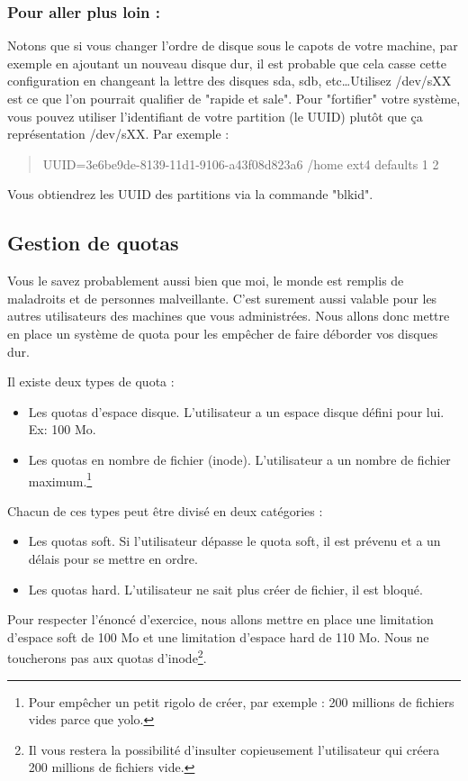 \documentclass[a4paper]{article}
\newcommand{\commande}[1] {
    \begin{quote}
    \tt\raggedright #1 
    \end{quote}
}
\begin{document}
\subsubsection*{Pour aller plus loin :}
\par Notons que si vous changer l'ordre de disque sous le capots de votre machine, par exemple en ajoutant un nouveau disque dur, il est probable que cela casse cette configuration en changeant la lettre des disques sda, sdb, etc\dots Utilisez /dev/sXX est ce que l'on pourrait qualifier de "rapide et sale". Pour "fortifier" votre système, vous pouvez utiliser l'identifiant de votre partition (le UUID) plutôt que ça représentation /dev/sXX. Par exemple :
\commande{UUID=3e6be9de-8139-11d1-9106-a43f08d823a6 /home ext4 defaults 1 2}
\par Vous obtiendrez les UUID des partitions via la commande "blkid".

\subsection{Gestion de quotas}
\par Vous le savez probablement aussi bien que moi, le monde est remplis de maladroits et de personnes malveillante. C'est surement aussi valable pour les autres utilisateurs des machines que vous administrées. Nous allons donc mettre en place un système de quota pour les empêcher de faire déborder vos disques dur.
\par Il existe deux types de quota :
\begin{itemize}
\item Les quotas d'espace disque. L'utilisateur a un espace disque défini pour lui. Ex: 100 Mo.
\item Les quotas en nombre de fichier (inode). L'utilisateur a un nombre de fichier maximum.\footnote{Pour empêcher un petit rigolo de créer, par exemple : 200 millions de fichiers vides parce que yolo.}
\end{itemize}
\par Chacun de ces types peut être divisé en deux catégories :
\begin{itemize}
\item Les quotas soft. Si l'utilisateur dépasse le quota soft, il est prévenu et a un délais pour se mettre en ordre.
\item Les quotas hard. L'utilisateur ne sait plus créer de fichier, il est bloqué.
\end{itemize}
\par Pour respecter l'énoncé d'exercice, nous allons mettre en place une limitation d'espace soft de 100 Mo et une limitation d'espace hard de 110 Mo. Nous ne toucherons pas aux quotas d'inode\footnote{Il vous restera la possibilité d'insulter copieusement l'utilisateur qui créera 200 millions de fichiers vide.}.
\end{document}
